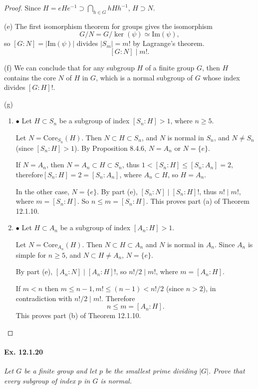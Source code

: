 \documentclass[11pt,a4paper]{article}
\newcommand{\be} {\begin{enumerate}}
\newcommand{\ee} {\end{enumerate}}
\begin{document}
\begin{proof}
Since $H = eHe^{-1} \supset \bigcap_{h\in G} hHh^{-1}$, $H\supset N$.

\item[(e)] The first isomorphism theorem for groups gives the isomorphism $$G/N = G/\ker(\psi) \simeq \mathrm{Im}(\psi),$$ so $[G:N] = |\mathrm{Im}(\psi)|$ divides $|S_m| = m!$ by Lagrange's theorem.
$$[G:N] \mid m!.$$

\item[(f)] We can conclude that for any subgroup $H$ of a finite group $G$, then $H$ contains the core $N$ of $H$ in $G$, which is a normal subgroup of $G$ whose index divides $[G:H]!$.

\item[(g)]
   \be \item[$\bullet$] Let $H \subset S_n$ be a subgroup of index $[S_n:H]>1$, where $n\geq 5$.
   
   Let $N = \mathrm{Core}_{S_n}(H)$. Then $N\subset H \subset S_n$, and $N$ is normal in $S_n$, and $N\ne S_n$ (since $[S_n:H]>1$). By Proposition 8.4.6, $N = A_n$ or $N=\{e\}$.
   
   If $N = A_n$, then $N=A_n \subset H \subset S_n$, thus $1< [S_n:H] \leq [S_n:A_n] = 2$, therefore$ [S_n:H] = 2 = [S_n:A_n]$, where $A_n \subset H$, so $H = A_n$.
   
   In the other case, $N = \{e\}$. By part (e), $[S_n : N] \mid [S_n:H]!$, thus $n! \mid m!$, where $m = [S_n:H]$. So $n\leq m =[S_n:H]$. This proves part (a) of Theorem 12.1.10.
   
   \item[$\bullet$] Let $H \subset A_n$ be a subgroup of index $[A_n:H]>1$.
   
   Let $N = \mathrm{Core}_{A_n}(H)$. Then $N \subset H \subset A_n$ and $N$ is normal in $A_n$. Since $A_n$ is simple for $n\geq 5$, and $N \subset H \ne A_n$, $N =\{e\}$.
   
   By part (e), $[A_n:N] \mid [A_n:H] !$, so $n!/2 \mid m!$, where $m = [A_n:H]$.
   
   If $m<n$ then $m \leq n-1, m! \leq (n-1) < n!/2$ (since $n>2$), in contradiction with $n!/2 \mid m!$. Therefore 
   $$n \leq m = [A_n:H].$$
   This proves part (b) of Theorem 12.1.10.
   \ee
   \end{proof}
   
  
\paragraph{Ex. 12.1.20}

{\it Let $G$ be a finite group and let $p$ be the smallest prime dividing $|G|$. Prove that every subgroup of index $p$ in $G$ is normal.
}
\end{document}
